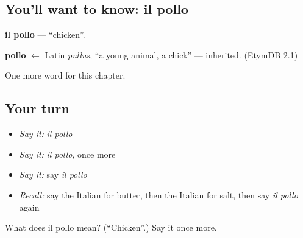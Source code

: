\subsection*{You'll want to know: il pollo}
\textbf{il pollo} — \textquotedblleft{}chicken\textquotedblright{}.

\begin{cousinweb}
\textbf{pollo} $\leftarrow$ Latin \emph{pullus}, \textquotedblleft{}a young animal, a chick\textquotedblright{} — inherited. (EtymDB 2.1)
\end{cousinweb}

\begin{grammarlens}[title={What you've built}]
One more word for this chapter.
\end{grammarlens}

\subsection*{Your turn}
\begin{itemize}
\raggedright
  \item \emph{Say it:} \emph{il pollo}
  \item \emph{Say it:} \emph{il pollo}, once more
  \item \emph{Say it:} say \emph{il pollo}
  \item \emph{Recall:} say the Italian for butter, then the Italian for salt, then say \emph{il pollo} again
\end{itemize}

\begin{tcolorbox}[breakable,colback=teal!4,colframe=teal!35!black,title={Before you move on}]
What does il pollo mean? (\textquotedblleft{}Chicken\textquotedblright{}.) Say it once more.
\end{tcolorbox}
